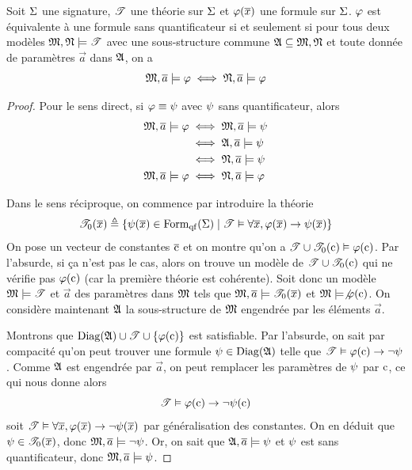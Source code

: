 \begin{proposition}\label{prop.carac.qf.sem}
  Soit $\Sigma$ une signature, $\mathscr T$ une théorie sur $\Sigma$ et
  $\varphi(\overline{x})$ une formule sur $\Sigma$. $\varphi$ est équivalente à une
  formule sans quantificateur si et seulement si pour tous deux modèles
  $\mathfrak{M},\mathfrak{N}\models\mathscr T$ avec une sous-structure commune
  $\mathfrak{A}\subseteq\mathfrak{M},\mathfrak{N}$ et toute donnée de paramètres $\vec a$ dans
  $\mathfrak{A}$, on a
  \[\mathfrak{M},\overline{a} \models \varphi \iff \mathfrak{N},\overline{a} \models\varphi\]
\end{proposition}

\begin{proof}
  Pour le sens direct, si $\varphi\equiv\psi$ avec $\psi$ sans
  quantificateur, alors
  \begin{align*}
    \mathfrak{M},\overline{a}\models\varphi&\iff \mathfrak{M},\overline{a} \models\psi\\
    &\iff \mathfrak{A},\overline{a}\models\psi\\
    &\iff\mathfrak{N},\overline{a} \models\psi\\
    \mathfrak{M},\overline{a} \models\varphi & \iff \mathfrak{N},\overline{a} \models\varphi
  \end{align*}

  Dans le sens réciproque, on commence par introduire la théorie
  \[\mathscr T_{0}(\overline{x}) \triangleq
  \left\{ \psi(\overline{x})\in\operatorname{Form}_{\mathrm{qf}}(\Sigma) \;\middle\vert\; \mathscr T\vDash\forall \overline{x},
    \varphi(\overline{x}) \to \psi(\overline{x}) \right\}\]
  On pose un vecteur de constantes $\overline{\mathrm{c}}$ et on montre qu'on a
  $\mathscr T\cup\mathscr T_0(\mathrm{c})\vDash\varphi(\mathrm{c})$. Par l'absurde, si ça n'est pas le cas,
  alors on trouve un modèle de $\mathscr T\cup\mathscr T_0(\mathrm{c})$ qui ne vérifie pas
  $\varphi(\mathrm{c})$ (car la première théorie est cohérente). Soit donc un modèle
  $\mathfrak{M}\models\mathscr T$ et $\vec a$ des paramètres dans $\mathfrak{M}$ tels que
  $\mathfrak{M},\overline{a}\models\mathscr T_0(\overline{x})$ et $\mathfrak{M}\models\not\varphi(\mathrm{c})$. On
  considère maintenant $\mathfrak{A}$ la sous-structure de $\mathfrak{M}$ engendrée par les
  éléments $\vec{a}$.

  Montrons que $\operatorname{Diag}(\mathfrak{A})\cup\mathscr T\cup\{\varphi(\mathrm{c})\}$ est satisfiable.
  Par l'absurde, on sait par compacité qu'on peut trouver une formule
  $\psi\in\operatorname{Diag}(\mathfrak{A})$ telle que $\mathscr T\vDash\varphi(\mathrm{c})\to\lnot\psi$. Comme
  $\mathfrak{A}$ est engendrée par $\vec a$, on peut remplacer les paramètres de
  $\psi$ par $\mathrm{c}$, ce qui nous donne alors
  \[\mathscr T\vDash\varphi(\mathrm{c})\to\lnot\psi(\mathrm{c})\]
  soit $\mathscr T\vDash\forall \overline{x}, \varphi(\overline{x})\to\lnot\psi(\overline{x})$
  par généralisation des constantes. On en déduit que
  $\psi\in\mathscr T_{0}(\overline{x})$, donc $\mathfrak{M},\overline{a} \models \lnot\psi$.
  Or, on sait que $\mathfrak{A},\overline{a} \models\psi$ et $\psi$ est sans
  quantificateur, donc $\mathfrak{M},\overline{a} \models\psi$.


\end{proof}
